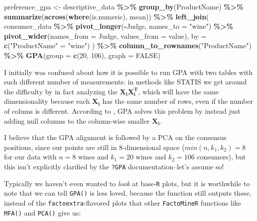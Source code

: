 \documentclass[
]{book}
\newenvironment{Shaded}{\begin{snugshade}}{\end{snugshade}}
\newcommand{\AttributeTok}[1]{\textcolor[rgb]{0.13,0.29,0.53}{#1}}
\newcommand{\ConstantTok}[1]{\textcolor[rgb]{0.56,0.35,0.01}{#1}}
\newcommand{\DecValTok}[1]{\textcolor[rgb]{0.00,0.00,0.81}{#1}}
\newcommand{\FunctionTok}[1]{\textcolor[rgb]{0.13,0.29,0.53}{\textbf{#1}}}
\newcommand{\NormalTok}[1]{#1}
\newcommand{\OtherTok}[1]{\textcolor[rgb]{0.56,0.35,0.01}{#1}}
\newcommand{\SpecialCharTok}[1]{\textcolor[rgb]{0.81,0.36,0.00}{\textbf{#1}}}
\newcommand{\StringTok}[1]{\textcolor[rgb]{0.31,0.60,0.02}{#1}}
\begin{document}
\begin{Shaded}
\begin{Highlighting}[]
\NormalTok{preference\_gpa }\OtherTok{\textless{}{-}} 
\NormalTok{  descriptive\_data }\SpecialCharTok{\%\textgreater{}\%}
  \FunctionTok{group\_by}\NormalTok{(ProductName) }\SpecialCharTok{\%\textgreater{}\%}
  \FunctionTok{summarize}\NormalTok{(}\FunctionTok{across}\NormalTok{(}\FunctionTok{where}\NormalTok{(is.numeric), mean)) }\SpecialCharTok{\%\textgreater{}\%}
  \FunctionTok{left\_join}\NormalTok{(}
\NormalTok{    consumer\_data }\SpecialCharTok{\%\textgreater{}\%}
      \FunctionTok{pivot\_longer}\NormalTok{(}\SpecialCharTok{{-}}\NormalTok{Judge, }\AttributeTok{names\_to =} \StringTok{"wine"}\NormalTok{) }\SpecialCharTok{\%\textgreater{}\%}
      \FunctionTok{pivot\_wider}\NormalTok{(}\AttributeTok{names\_from =}\NormalTok{ Judge, }\AttributeTok{values\_from =}\NormalTok{ value),}
    \AttributeTok{by =} \FunctionTok{c}\NormalTok{(}\StringTok{"ProductName"} \OtherTok{=} \StringTok{"wine"}\NormalTok{)}
\NormalTok{  ) }\SpecialCharTok{\%\textgreater{}\%}
  \FunctionTok{column\_to\_rownames}\NormalTok{(}\StringTok{"ProductName"}\NormalTok{) }\SpecialCharTok{\%\textgreater{}\%}
  \FunctionTok{GPA}\NormalTok{(}\AttributeTok{group =} \FunctionTok{c}\NormalTok{(}\DecValTok{20}\NormalTok{, }\DecValTok{106}\NormalTok{), }\AttributeTok{graph =} \ConstantTok{FALSE}\NormalTok{)}
\end{Highlighting}
\end{Shaded}

I initially was confused about how it is possible to run GPA with two tables with such different number of measurements: in methods like STATIS we get around the difficulty by in fact analyzing the \(\mathbf{X_iX_i^T}\), which will have the same dimensionality because each \(\mathbf{X_i}\) has the same number of rows, even if the number of colums is different. According to \citet{gowerGeneralized1975}, GPA solves this problem by instead just adding null columns to the column-wise smaller \(\mathbf{X_i}\).

I believe that the GPA alignment is followed by a PCA on the consensus positions, since our points are still in 8-dimensional space (\(min(n, k_1, k_2) = 8\) for our data with \(n=8\) wines and \(k_1=20\) wines and \(k_2=106\) consumers), but this isn't explicitly clarified by the \texttt{?GPA} documentation--let's assume so!

Typically we haven't even wanted to \emph{look} at base-\texttt{R} plots, but it is worthwhile to note that we can tell \texttt{GPA()} is less loved, because the function still outputs these, instead of the \texttt{factoextra}-flavored plots that other \texttt{FactoMineR} functions like \texttt{MFA()} and \texttt{PCA()} give us:
\end{document}
